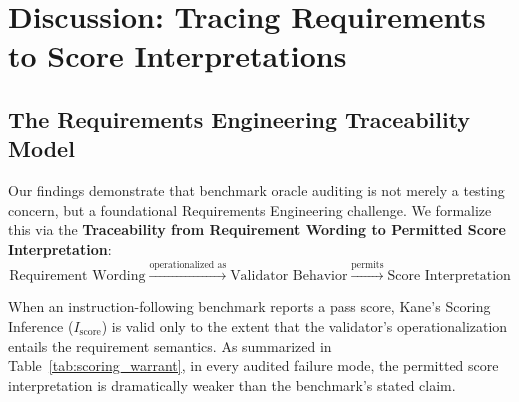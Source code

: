 \documentclass[runningheads]{llncs}
\begin{document}
\section{Discussion: Tracing Requirements to Score Interpretations}
\label{sec:discussion}

\subsection{The Requirements Engineering Traceability Model}
Our findings demonstrate that benchmark oracle auditing is not merely a testing concern, but a foundational Requirements Engineering challenge. We formalize this via the \textbf{Traceability from Requirement Wording to Permitted Score Interpretation}:
\begin{equation}
\label{eq:re_trace}
\text{Requirement Wording} \xrightarrow{\text{operationalized as}} \text{Validator Behavior} \xrightarrow{\text{permits}} \text{Score Interpretation}
\end{equation}

When an instruction-following benchmark reports a pass score, Kane's Scoring Inference ($I_{\text{score}}$) is valid only to the extent that the validator's operationalization entails the requirement semantics. As summarized in Table~\ref{tab:scoring_warrant}, in every audited failure mode, the permitted score interpretation is dramatically weaker than the benchmark's stated claim.
\end{document}
